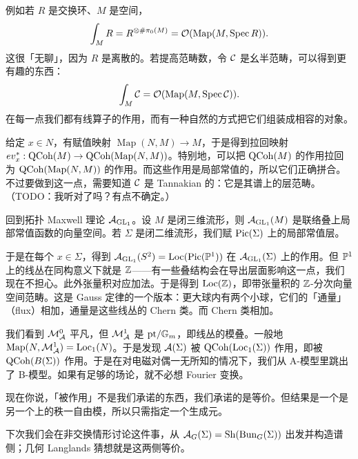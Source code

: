 例如若 $R$ 是交换环、$M$ 是空间，
\[
\int_M R=R^{\otimes\#\pi_0(M)}=\cO(\operatorname{Map}(M,\Spec R)).
\]
这很「无聊」，因为 $R$ 是离散的。若提高范畴数，令 $\cC$ 是幺半范畴，可以得到更有趣的东西：
\[
\int_M \cC=\cO(\operatorname{Map}(M,\Spec\cC)).
\]
在每一点我们都有线算子的作用，而有一种自然的方式把它们组装成相容的对象。

给定 $x\in N$，有赋值映射 $\operatorname{Map}(N,M)\to M$，于是得到拉回映射 $ev_x^*:\QCoh(M)\to\QCoh(\operatorname{Map}(N,M))$。特别地，可以把 $\QCoh(M)$ 的作用拉回为 $\QCoh(\operatorname{Map}(N,M))$ 的作用。而这些作用是局部常值的，所以它们正确拼合。不过要做到这一点，需要知道 $\cC$ 是 Tannakian 的：它是其谱上的层范畴。（TODO：我听对了吗？有点不确定。）


回到拓扑 Maxwell 理论 $\cA_{\mathrm{GL}_1}$。设 $M$ 是闭三维流形，则 $\cA_{\mathrm{GL}_1}(M)$ 是联络叠上局部常值函数的向量空间。若 $\Sigma$ 是闭二维流形，我们赋 $\Pic(\Sigma)$ 上的局部常值层。

于是在每个 $x\in\Sigma$，得到 $\cA_{\mathrm{GL}_1}(S^2)=\mathrm{Loc}(\Pic(\P^1))$ 在 $\cA_{\mathrm{GL}_1}(\Sigma)$ 上的作用。但 $\P^1$ 上的线丛在同构意义下就是 $\Z$——有一些叠结构会在导出层面影响这一点，我们现在不担心。此外张量积对应加法。于是得到 $\mathrm{Loc}(\Z)$，即带张量积的 $\Z$-分次向量空间范畴。这是 Gauss 定律的一个版本：更大球内有两个小球，它们的「通量」（flux）相加，通量是这些线丛的 Chern 类。而 Chern 类相加。

我们看到 $\cM^0_\cA$ 平凡，但 $\cM^1_\cA$ 是 $\mathrm{pt}/\G_m$，即线丛的模叠。一般地 $\operatorname{Map}(N,\cM^1_\cA)=\mathrm{Loc}_1(N)$。于是发现 $\cA(\Sigma)$ 被 $\QCoh(\mathrm{Loc}_1(\Sigma))$ 作用，即被 $\QCoh(B(\Sigma))$ 作用。于是在对电磁对偶一无所知的情况下，我们从 A-模型里跳出了 B-模型。如果有足够的场论，就不必想 Fourier 变换。

现在你说，「被作用」不是我们承诺的东西，我们承诺的是等价。但结果是一个是另一个上的秩一自由模，所以只需指定一个生成元。

下次我们会在非交换情形讨论这件事，从 $\cA_G(\Sigma)=\mathrm{Sh}(\Bun_G(\Sigma))$ 出发并构造谱侧；几何 Langlands 猜想就是这两侧等价。
